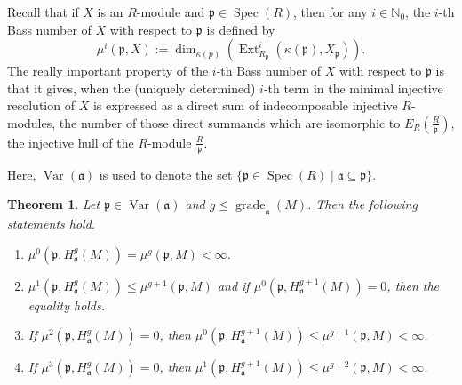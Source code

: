 \documentclass[12pt,twoside, final]{amsart}
\numberwithin{equation}{section}
\newtheorem{thm}{Theorem}[section]
\newtheorem{nota rem}[thm]{Notation and Remark}
\newtheorem{defen rem}[thm]{Definition and Remark}
\def\Ext{\operatorname{Ext}}
\def\Spec{\operatorname{Spec}}
\def\grade{\operatorname{grade}}
\def\var{\operatorname{Var}}
\def\dim{\operatorname{dim}}
\newcommand{\p}{\mathfrak{p}}
\newcommand{\fa}{\mathfrak{a}}
\newcommand{\NN}{\mathbb{N}}
\begin{document}
Recall that  if $X$ is an $R$-module and $\p\in \Spec(R)$, then for any $i\in \NN_0$, the $i$-th Bass number of $X$ with respect to $\p$ is defined by
\begin{equation}\label{Bass}
    \mu^i(\p, X):= \dim_{\kappa(p)}(\Ext^i_{R_{\p}}(\kappa(\p), X_{\p})).
\end{equation}
The really important property of the
$i$-th Bass number of $X$ with respect to $\p$  is that it gives, when the (uniquely determined) $i$-th term in the minimal injective resolution of $X$ is expressed as a direct sum of indecomposable injective $R$-modules, the number of those direct summands which
are isomorphic to $E_R(\tfrac{R}{\p})$, the injective hull of the $R$-module $\tfrac{R}{\p}$.

Here, $\var(\fa)$ is used to denote the set $ \{\p\in\Spec(R)\mid \fa\subseteq \p\}$.
 
\begin{thm}\label{grade}
Let $\p\in \var(\fa)$ and   $g\leq \grade_{\fa}(M)$. Then the following statements hold.
\begin{enumerate}
    \item $\mu^0(\p, H^g_{\fa}(M))= \mu^g(\p, M)< \infty$.
    \item $\mu^1(\p, H^g_{\fa}(M))\leq \mu^{g+ 1}(\p, M)$ and if $\mu^0(\p, H^{g+ 1}_{\fa}(M))= 0$, then the equality holds.
    \item If $\mu^2(\p, H^g_{\fa}(M))= 0$, then $\mu^0(\p, H^{g+ 1}_{\fa}(M)) \leq \mu^{g+ 1}(\p, M)< \infty$.
    \item If $\mu^3(\p, H^g_{\fa}(M))= 0$, then $\mu^1(\p, H^{g+ 1}_{\fa}(M)) \leq \mu^{g+ 2}(\p, M)< \infty$.
\end{enumerate}
    \end{thm}
\end{document}
